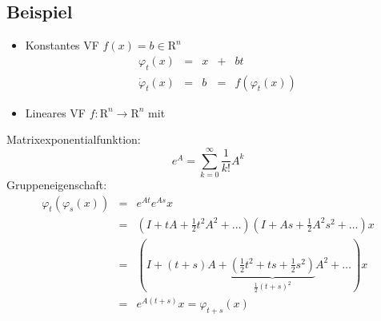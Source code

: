 \documentclass[ngerman]{tudscrreprt}
\begin{document}
\subsection*{Beispiel}
\begin{itemize}
\item Konstantes VF $f(x) = b \in \mathrm{R}^n$ \begin{equation*}
\begin{matrix}
\varphi_t(x) &=& x &+& bt \\ 
\dot \varphi_t(x)&=&b &=&f(\varphi_t(x))
\end{matrix}
\end{equation*}
\item Lineares VF $f: \mathrm{R}^n \to \mathrm{R}^n$ mit 
\end{itemize} 
Matrixexponentialfunktion: \begin{equation*}
e^A = \sum_{k=0}^{\infty} \frac{1}{k!}A^k
\end{equation*}
Gruppeneigenschaft: 
\begin{equation*}
\begin{matrix}
\varphi_t(\varphi_s(x)) &=&e^{At} e^{As} x \\ 
&=& (I + tA + \frac{1}{2} t^2 A^2 + \dots )(I + As + \frac{1}{2}A^2s^2 + \dots  )x\\ 
&=& (I + (t + s)A + \underbrace{(\frac{1}{2} t^2 + ts + \frac{1}{2} s^2 )}_{\frac{1}{2}(t+s)^2  }A^2 + \dots ) x \\ 
&=& e^{A(t+s)}x = \varphi_{t+s}(x)
\end{matrix}
\end{equation*}
\end{document}
